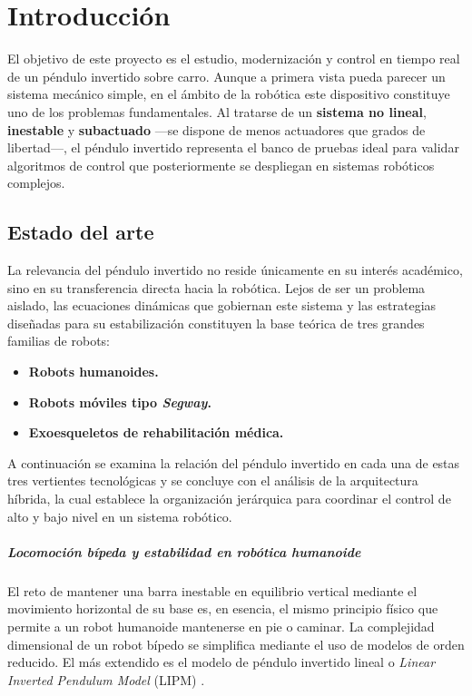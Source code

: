 \documentclass[11pt,fleqn]{book} %
\begin{document}
\pagestyle{empty} %

\renewcommand{\contentsname}{ÍNDICE GENERAL}
\tableofcontents %

\cleardoublepage %

\pagestyle{fancy} %

\chapter{Introducción}
\label{ch:introduccion}

El objetivo de este proyecto es el estudio, modernización y control en tiempo real de un péndulo invertido sobre carro. Aunque a primera vista pueda parecer un sistema mecánico simple, en el ámbito de la robótica este dispositivo constituye uno de los problemas fundamentales. Al tratarse de un \textbf{sistema no lineal}, \textbf{inestable} y \textbf{subactuado} —se dispone de menos actuadores que grados de libertad—, el péndulo invertido representa el banco de pruebas ideal para validar algoritmos de control que posteriormente se despliegan en sistemas robóticos complejos.

\section{Estado del arte}
La relevancia del péndulo invertido no reside únicamente en su interés académico, sino en su transferencia directa hacia la robótica. Lejos de ser un problema aislado, las ecuaciones dinámicas que gobiernan este sistema y las estrategias diseñadas para su estabilización constituyen la base teórica de tres grandes familias de robots: 
\begin{itemize}[]
	\item \textbf{Robots humanoides.}
	\item \textbf{Robots móviles tipo \textit{Segway}.}
	\item \textbf{Exoesqueletos de rehabilitación médica.}
\end{itemize}

A continuación se examina la relación del péndulo invertido en cada una de estas tres vertientes tecnológicas y se concluye con el análisis de la arquitectura híbrida, la cual establece la organización jerárquica para coordinar el control de alto y bajo nivel en un sistema robótico.
\newpage
\paragraph{Locomoción bípeda y estabilidad en robótica humanoide}
El reto de mantener una barra inestable en equilibrio vertical mediante el movimiento horizontal de su base es, en esencia, el mismo principio físico que permite a un robot humanoide mantenerse en pie o caminar. La complejidad dimensional de un robot bípedo se simplifica mediante el uso de modelos de orden reducido. El más extendido es el modelo de péndulo invertido lineal o \textit{Linear Inverted Pendulum Model} (LIPM) \cite{stephens2008}. 
\end{document}
